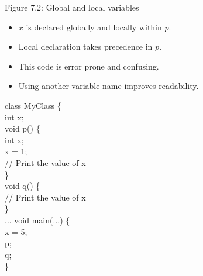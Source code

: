 \documentclass[style=sailor,size=12pt,mode=present]{powerdot}
\theoremstyle{definition}
\begin{document}
\begin{wideslide}[bm=,toc=]{Figure 7.2: Global and local variables}
\begin{multicols}{2}
\begin{itemize}
\item $x$ is declared globally and locally within $p$.
\item Local declaration takes precedence in $p$.
\item This code is error prone and confusing.
\item Using another variable name improves readability.
\end{itemize}
\vspace*{-2ex}
\begin{program}
class MyClass \{\\
\>int x;\\
\>void p() \{\\
\>\>int x;\\
\>\>x = 1;\\
\>\>// Print the value of x\\
\>\}\\
\>void q() \{\\
\>\>// Print the value of x\\
\>\}\\
\>... void main(...) \{\\
\>x = 5;\\
\>p;\\
\>q;\\
\}
\end{program}
\end{multicols}
\end{wideslide}
\end{document}
